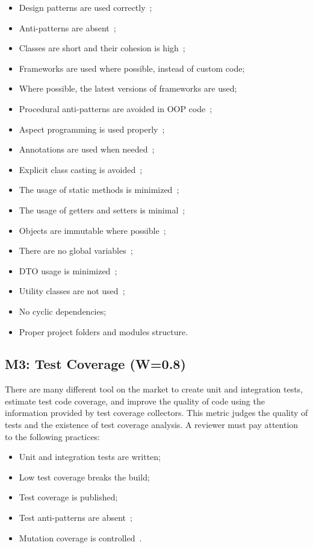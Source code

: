 \documentclass[12pt,oneside]{article}
\begin{document}
\begin{itemize}
\item Design patterns are used correctly~\citep{gamma1993design,holub2004holub,freeman2008head,fowler2003patterns};
\item Anti-patterns are absent~\citep{jaafar2013mining};
\item Classes are short and their cohesion is high~\citep[pp.93--95]{eo1};
\item Frameworks are used where possible, instead of custom code;
\item Where possible, the latest versions of frameworks are used;
\item Procedural anti-patterns are avoided in OOP code~\citep[pp.19--26]{eo1};
\item Aspect programming is used properly~\citep[pp.210--212]{eo1};
\item Annotations are used when needed~\citep[pp.163]{eo2};
\item Explicit class casting is avoided~\citep[pp.181--186]{eo2};
\item The usage of static methods is minimized~\citep[pp.117--145]{eo2};
\item The usage of getters and setters is minimal~\citep[pp.165--174]{eo1};
\item Objects are immutable where possible~\citep[pp.78--89]{eo2};
\item There are no global variables~\citep{yb-global-vars};
\item DTO usage is minimized~\citep[p.179]{eo2};
\item Utility classes are not used~\citep[p.40]{eo2};
\item No cyclic dependencies;
\item Proper project folders and modules structure.
\end{itemize}

\subsection{M3: Test Coverage (W=0.8)}

There are many different tool on the market to create unit and integration tests,
estimate test code coverage, and improve the quality of code using
the information provided by test coverage collectors. This metric judges
the quality of tests and the existence of test coverage analysis. A reviewer
must pay attention to the following practices:

\begin{itemize}
  \item Unit and integration tests are written;
  \item Low test coverage breaks the build;
  \item Test coverage is published;
  \item Test anti-patterns are absent~\citep{yb-test-anti};
  \item Mutation coverage is controlled~\citep{andrews2006using}.
\end{itemize}
\end{document}
